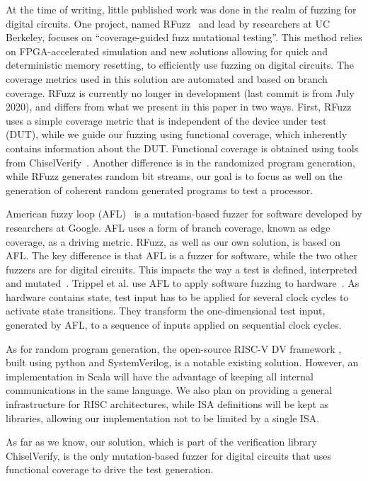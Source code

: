 \documentclass[conference]{IEEEtran}
\begin{document}
At the time of writing, little published work was done in the realm of fuzzing for digital circuits.
One project, named RFuzz~\cite{rfuzz2018} and lead by researchers at UC Berkeley, focuses on ``coverage-guided fuzz mutational testing''. This method relies on FPGA-accelerated simulation and new solutions allowing for quick and deterministic memory resetting, to efficiently use fuzzing on digital circuits. The coverage metrics used in this solution are automated and based on branch coverage. RFuzz is currently no longer in development (last commit is from July 2020), and differs from what we present in this paper in two ways. First, RFuzz uses a simple coverage metric that is independent of the device under test (DUT), while we guide our fuzzing using functional coverage, which inherently contains information about the DUT. Functional coverage is obtained using tools from ChiselVerify~\cite{verify:chisel:2020, ChiselVerify:2021}.
Another difference is in the randomized program generation, while RFuzz generates random bit streams, our goal is to focus as well on the generation of coherent random generated programs to test a processor.

American fuzzy loop (AFL)~\cite{afl:repo} is a mutation-based fuzzer for software developed by researchers at Google. 
AFL uses a form of branch coverage, known as edge coverage, as a driving metric.
RFuzz, as well as our own solution, is based on AFL. 
The key difference is that AFL is a fuzzer for software, while the two other fuzzers are for digital circuits.
This impacts the way a test is defined, interpreted and mutated~\cite{rfuzz2018}.
Trippel et al. use AFL to apply software fuzzing to hardware~\cite{DBLP:journals/corr/abs-2102-02308}.
As hardware contains state, test input has to be applied for several clock cycles to activate state transitions.
They transform the one-dimensional test input, generated by AFL, to a sequence of inputs applied
on sequential clock cycles.

As for random program generation, the open-source RISC-V DV framework \cite{riscvdv}, built using python and SystemVerilog, is a notable existing solution. 
However, an implementation in Scala will have the advantage of keeping all internal communications in the same language. 
We also plan on providing a general infrastructure for RISC architectures, while ISA definitions will be kept as libraries, allowing our implementation not to be limited by a single ISA.

As far as we know, our solution, which is part of the verification library ChiselVerify, is the only mutation-based fuzzer for digital circuits that uses functional coverage to drive the test generation.
\end{document}
